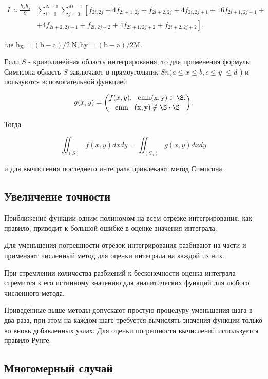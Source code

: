 \documentclass[a4paper]{article}
\begin{document}
{{{{{{{{$$
\begin{aligned}
I \approx \frac{h_{x} h_{y}}{9} & \sum_{i=0}^{N-1} \sum_{j=0}^{M-1}\left[f_{2 i, 2 j}+4 f_{2 i+1,2 j}+f_{2 i+2,2 j}+4 f_{2 i, 2 j+1}+16 f_{2 i+1,2 j+1}+\right. \\
& \left.+4 f_{2 i+2,2 j+1}+f_{2 i, 2 j+2}+4 f_{2 i+1,2 j+2}+f_{2 i+2,2 j+2}\right],
\end{aligned}
$$

где $\mathrm{h}_{\mathrm{X}}=(\mathrm{b}-\mathrm{a}) / 2 \mathrm{~N}, \mathrm{hy}=(\mathrm{b}-\mathrm{a}) / 2 \mathrm{M}$.

Если $S$ - криволинейная область интегрирования, то для применения формулы Симпсона область $S$ заключают в прямоугольник $S n(a \leq x \leq b, c \leq y$ $\leq d$ ) и пользуются вспомогательной функцией

$$
g(x,y)={\binom{f(x,y),\ \ \mathrm{emn\\(x,y)\in{\S}},}{\mathrm{emn\\(x,y)\notin{\S}\cdot{\S}}}}.
$$

Тогда

$$
\iint_{(S)} f(x, y) d x d y=\iint_{\left(S_{n}\right)} g(x, y) d x d y
$$

и для вычисления последнего интеграла привлекают метод Симпсона.

\newpage

\subsection{Увеличение точности}

Приближение функции одним полиномом на всем отрезке интегрирования, как правило, приводит к большой ошибке в оценке значения интеграла.

Для уменьшения погрешности отрезок интегрирования разбивают на части и применяют численный метод для оценки интеграла на каждой из них.

При стремлении количества разбиений к бесконечности оценка интеграла стремится к его истинному значению для аналитических функций для любого численного метода.

Приведённые выше методы допускают простую процедуру уменьшения шага в два раза, при этом на каждом шаге требуется вычислять значения функции только во вновь добавленных узлах. Для оценки погрешности вычислений используется правило Рунге.

\subsection{Многомерный случай}

}}}}}}}}
\end{document}
